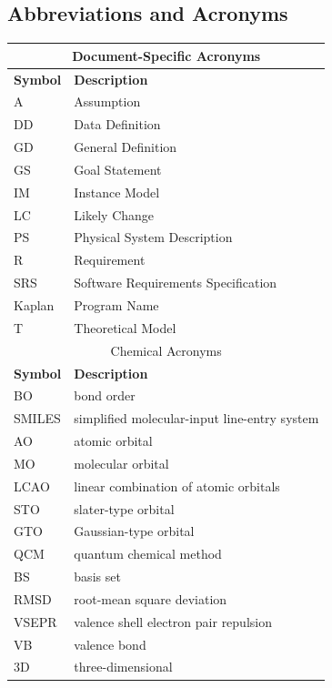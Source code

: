 \documentclass[12pt]{article}
\newcommand{\progname}{Kaplan} %
\begin{document}
\subsection{Abbreviations and Acronyms}

\renewcommand{\arraystretch}{1.2}
\begin{tabular}{l l} 
  \toprule
  \multicolumn{2}{c}{\large{Document-Specific Acronyms}} \\
  \midrule
  \textbf{Symbol} & \textbf{Description}\\
  \midrule 
  A & Assumption\\
  DD & Data Definition\\
  GD & General Definition\\
  GS & Goal Statement\\
  IM & Instance Model\\
  LC & Likely Change\\
  PS & Physical System Description\\
  R & Requirement\\
  SRS & Software Requirements Specification\\
  \progname{} & Program Name \\
  T & Theoretical Model\\
  \midrule
  \multicolumn{2}{c}{\large{Chemical Acronyms}} \\
  \midrule
  \textbf{Symbol} & \textbf{Description}\\
  \midrule
  BO & bond order \\
  SMILES & simplified molecular-input line-entry system \\
  AO & atomic orbital \\
  MO & molecular orbital \\
  LCAO & linear combination of atomic orbitals \\
  STO & slater-type orbital \\
  GTO & Gaussian-type orbital \\
  QCM & quantum chemical method \\
  BS & basis set \\
  RMSD & root-mean square deviation \\
  VSEPR & valence shell electron pair repulsion \\
  VB & valence bond \\
  3D & three-dimensional \\
  \bottomrule
\end{tabular}\\
\end{document}
